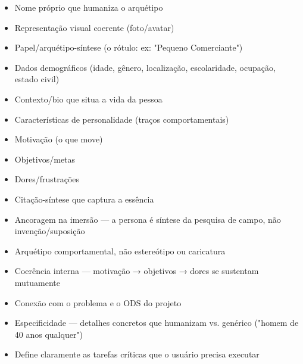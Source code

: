 \documentclass[
  sigconf,
  nonacm, %
  language=portuguese
]{acmart}
\begin{document}
\begin{itemize}[leftmargin=14pt,itemsep=1pt,topsep=3pt,parsep=0pt]
  \item[\textcolor{cgood}{$\checkmark$}] {\small\textcolor{cgood}{Nome próprio que humaniza o arquétipo}}
  \item[\textcolor{cgood}{$\checkmark$}] {\small\textcolor{cgood}{Representação visual coerente (foto/avatar)}}
  \item[\textcolor{cgood}{$\checkmark$}] {\small\textcolor{cgood}{Papel/arquétipo-síntese (o rótulo: ex: "Pequeno Comerciante")}}
  \item[\textcolor{cgood}{$\checkmark$}] {\small\textcolor{cgood}{Dados demográficos (idade, gênero, localização, escolaridade, ocupação, estado civil)}}
  \item[\textcolor{cgood}{$\checkmark$}] {\small\textcolor{cgood}{Contexto/bio que situa a vida da pessoa}}
  \item[$\square$] {\small\textcolor{cmuted}{Características de personalidade (traços comportamentais)}}
  \item[\textcolor{cgood}{$\checkmark$}] {\small\textcolor{cgood}{Motivação (o que move)}}
  \item[$\square$] {\small\textcolor{cmuted}{Objetivos/metas}}
  \item[\textcolor{cgood}{$\checkmark$}] {\small\textcolor{cgood}{Dores/frustrações}}
  \item[\textcolor{cgood}{$\checkmark$}] {\small\textcolor{cgood}{Citação-síntese que captura a essência}}
  \item[\textcolor{cgood}{$\checkmark$}] {\small\textcolor{cgood}{Ancoragem na imersão — a persona é síntese da pesquisa de campo, não invenção/suposição}}
  \item[\textcolor{cgood}{$\checkmark$}] {\small\textcolor{cgood}{Arquétipo comportamental, não estereótipo ou caricatura}}
  \item[\textcolor{cgood}{$\checkmark$}] {\small\textcolor{cgood}{Coerência interna — motivação → objetivos → dores se sustentam mutuamente}}
  \item[\textcolor{cgood}{$\checkmark$}] {\small\textcolor{cgood}{Conexão com o problema e o ODS do projeto}}
  \item[\textcolor{cgood}{$\checkmark$}] {\small\textcolor{cgood}{Especificidade — detalhes concretos que humanizam vs. genérico ("homem de 40 anos qualquer")}}
  \item[\textcolor{cgood}{$\checkmark$}] {\small\textcolor{cgood}{Define claramente as tarefas críticas que o usuário precisa executar}}
\end{itemize}
\end{document}
